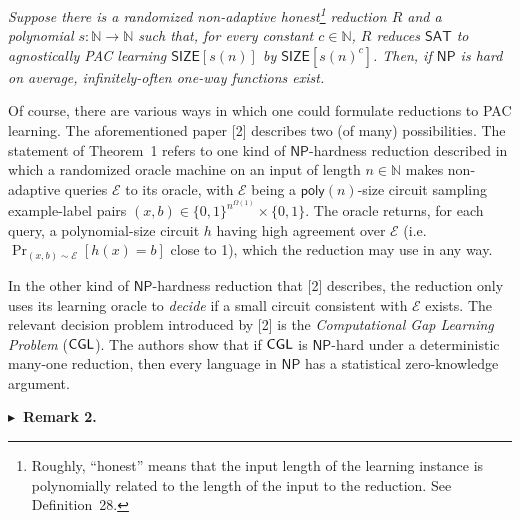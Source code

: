 \documentclass[10pt,a4paper]{article}
\begin{document}
\emph{Suppose there is a randomized non-adaptive honest\footnote{Roughly, “honest” means that the input length of the learning instance is polynomially related to the length of the input to the reduction. See Definition 28.} reduction $R$ and a polynomial $s:\mathbb{N}\to\mathbb{N}$ such that, for every constant $c\in\mathbb{N}$, $R$ reduces ${\mathsf{SAT}}$ to agnostically PAC learning ${\mathsf{SIZE}}[s(n)]$ by ${\mathsf{SIZE}}[s(n)^{c}]$. Then, if ${\mathsf{NP}}$ is hard on average, infinitely-often one-way functions exist.}\par






Of course, there are various ways in which one could formulate reductions to PAC learning. The aforementioned paper [2] describes two (of many) possibilities. The statement of Theorem 1 refers to one kind of ${\mathsf{NP}}$-hardness reduction described in which a randomized oracle machine on an input of length $n\in\mathbb{N}$ makes non-adaptive queries $\mathcal{E}$ to its oracle, with $\mathcal{E}$ being a ${\mathsf{poly}}(n)$-size circuit sampling example-label pairs $(x,b)\in\{0,1\}^{n^{\Omega(1)}}\times\{0,1\}$. The oracle returns, for each query, a polynomial-size circuit $h$ having high agreement over $\mathcal{E}$ (i.e. $\Pr_{(x,b)\sim\mathcal{E}}[h(x)=b]$ close to 1), which the reduction may use in any way.\par




In the other kind of ${\mathsf{NP}}$-hardness reduction that [2] describes, the reduction only uses its learning oracle to \emph{decide} if a small circuit consistent with $\mathcal{E}$ exists. The relevant decision problem introduced by [2] is the \emph{Computational Gap Learning Problem} (${\sf CGL}$). The authors show that if ${\sf CGL}$ is ${\mathsf{NP}}$-hard under a deterministic many-one reduction, then every language in ${\mathsf{NP}}$ has a statistical zero-knowledge argument.\par





\par\medskip\noindent\textbf{
$\blacktriangleright$ Remark 2.
}\par
\end{document}
